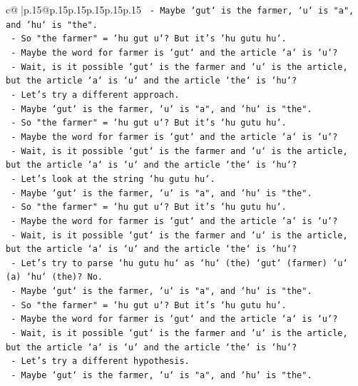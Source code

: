 \documentclass{article}
\begin{document}
{\begin{supertabular}{c@{$\;$}|p{.15\linewidth}@{}p{.15\linewidth}p{.15\linewidth}p{.15\linewidth}p{.15\linewidth}p{.15\linewidth}}
{{{\texttt{   {-} Maybe `gut` is the farmer, `u` is "a", and `hu` is "the".} \\
\texttt{   {-} So "the farmer" = `hu gut u`? But it's `hu gutu hu`.} \\
\texttt{   {-} Maybe the word for farmer is `gut` and the article `a` is `u`?} \\
\texttt{   {-} Wait, is it possible `gut` is the farmer and `u` is the article, but the article `a` is `u` and the article `the` is `hu`?} \\
\texttt{   {-} Let's try a different approach.} \\
\texttt{   {-} Maybe `gut` is the farmer, `u` is "a", and `hu` is "the".} \\
\texttt{   {-} So "the farmer" = `hu gut u`? But it's `hu gutu hu`.} \\
\texttt{   {-} Maybe the word for farmer is `gut` and the article `a` is `u`?} \\
\texttt{   {-} Wait, is it possible `gut` is the farmer and `u` is the article, but the article `a` is `u` and the article `the` is `hu`?} \\
\texttt{   {-} Let's look at the string `hu gutu hu`.} \\
\texttt{   {-} Maybe `gut` is the farmer, `u` is "a", and `hu` is "the".} \\
\texttt{   {-} So "the farmer" = `hu gut u`? But it's `hu gutu hu`.} \\
\texttt{   {-} Maybe the word for farmer is `gut` and the article `a` is `u`?} \\
\texttt{   {-} Wait, is it possible `gut` is the farmer and `u` is the article, but the article `a` is `u` and the article `the` is `hu`?} \\
\texttt{   {-} Let's try to parse `hu gutu hu` as `hu` (the) `gut` (farmer) `u` (a) `hu` (the)? No.} \\
\texttt{   {-} Maybe `gut` is the farmer, `u` is "a", and `hu` is "the".} \\
\texttt{   {-} So "the farmer" = `hu gut u`? But it's `hu gutu hu`.} \\
\texttt{   {-} Maybe the word for farmer is `gut` and the article `a` is `u`?} \\
\texttt{   {-} Wait, is it possible `gut` is the farmer and `u` is the article, but the article `a` is `u` and the article `the` is `hu`?} \\
\texttt{   {-} Let's try a different hypothesis.} \\
\texttt{   {-} Maybe `gut` is the farmer, `u` is "a", and `hu` is "the".} \\
}}}
\end{supertabular}}
\end{document}

